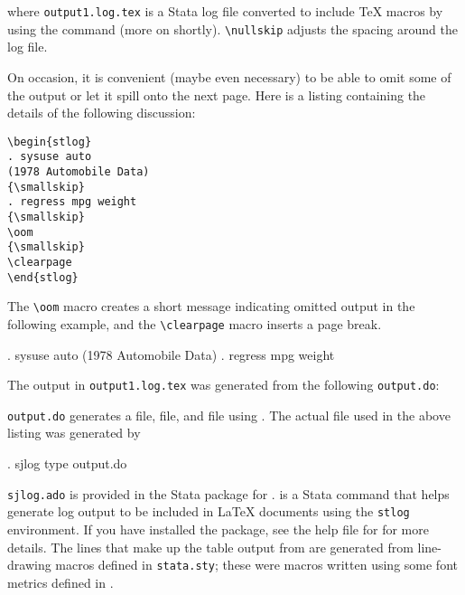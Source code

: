 \noindent
where \texttt{output1.log.tex} is a Stata log file converted to include \TeX{}
macros by using the  command (more on  shortly).
\verb+\nullskip+ adjusts the spacing around the log file.

\clearpage
On occasion, it is convenient (maybe even necessary) to be able to omit some of
the output or let it spill onto the next page.  Here is a listing containing
the details of the following discussion:

\begin{stverbatim}
\begin{verbatim}
\begin{stlog}
. sysuse auto
(1978 Automobile Data)
{\smallskip}
. regress mpg weight
{\smallskip}
\oom
{\smallskip}
\clearpage
\end{stlog}
\end{verbatim}
\end{stverbatim}

The \verb+\oom+ macro creates
a short message indicating omitted output in the following example, and the
\verb+\clearpage+ macro inserts a page break.

\begin{stlog}
. sysuse auto
(1978 Automobile Data)
{\smallskip}
. regress mpg weight
{\smallskip}
\oom
{\smallskip}
\clearpage
\end{stlog}

The output in \texttt{output1.log.tex} was generated from the following
\texttt{output.do}:

\begin{stlog}

\end{stlog}

\noindent
\texttt{output.do} generates a  file,  file,
and  file using .  The actual file used in the
above listing was generated by

\begin{stlog}
. sjlog type output.do
\end{stlog}

\texttt{sjlog.ado} is provided in the Stata package for .
 is a Stata command that helps generate log output to be included
in {\LaTeX} documents using the \texttt{stlog} environment.  If you have
installed the  package, see the help file for  for
more details.  The lines that make up the table output from 
are generated from line-drawing macros defined in \texttt{stata.sty}; these
were macros written using some font metrics defined in \citet{texbook}.

